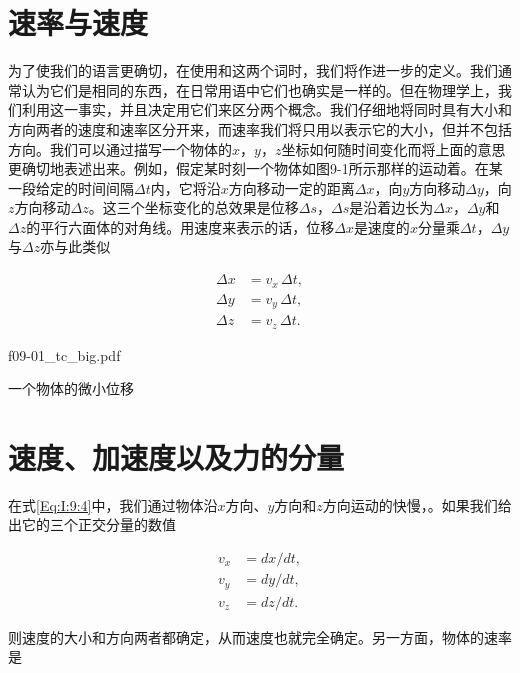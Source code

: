 \documentclass[12pt,oneside]{book}
\begin{document}
\section{速率与速度}
为了使我们的语言更确切，在使用和这两个词时，我们将作进一步的定义。我们通常认为它们是相同的东西，在日常用语中它们也确实是一样的。但在物理学上，我们利用这一事实，并且决定用它们来区分两个概念。我们仔细地将同时具有大小和方向两者的速度和速率区分开来，而速率我们将只用以表示它的大小，但并不包括方向。我们可以通过描写一个物体的$ x $，$ y $，$ z $坐标如何随时间变化而将上面的意思更确切地表述出来。例如，假定某时刻一个物体如图9-1所示那样的运动着。在某一段给定的时间间隔$ \Delta t $内，它将沿$ x $方向移动一定的距离$  \Delta x $，向$ y $方向移动$ \Delta y $，向$ z $方向移动$\Delta z $。这三个坐标变化的总效果是位移$ \Delta s $，$ \Delta s $是沿着边长为$ \Delta x $，$ \Delta y $和$ \Delta z $的平行六面体的对角线。用速度来表示的话，位移$ \Delta x $是速度的$ x $分量乘$ \Delta t $，$ \Delta y $与$ \Delta z $亦与此类似

\begin{equation}
\begin{aligned}
\Delta x&=v_x\,\Delta t,\\[.5ex]
\Delta y&=v_y\,\Delta t,\\[.5ex]
\Delta z&=v_z\,\Delta t.
\end{aligned}
\label{Eq:I:9:4}
\end{equation}

\begin{fig}{f09-01_tc_big.pdf}
\caption{一个物体的微小位移}
\label{fig:一个物体的微小位移}
\end{fig}

\section{速度、加速度以及力的分量}

在式\eqref{Eq:I:9:4}中，我们通过物体沿$ x $方向、$ y $方向和$ z $方向运动的快慢，。如果我们给出它的三个正交分量的数值

\begin{equation}
\begin{aligned}
v_x&=dx/dt,\\[.5ex]
v_y&=dy/dt,\\[.5ex]
v_z&=dz/dt.
\end{aligned}
\label{Eq:I:9:5}
\end{equation}

则速度的大小和方向两者都确定，从而速度也就完全确定。另一方面，物体的速率是
\end{document}
